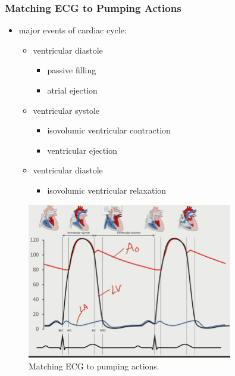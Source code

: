 \documentclass[10pt]{article}
\begin{document}
\subsubsection{Matching ECG to Pumping Actions}
\begin{itemize}
    \item major events of cardiac cycle:
        \begin{itemize}
            \item ventricular diastole
                \begin{itemize}
                    \item passive filling
                    \item atrial ejection
                \end{itemize}
            \item ventricular systole
                \begin{itemize}
                    \item isovolumic ventricular contraction
                    \item ventricular ejection
                \end{itemize}
            \item ventricular diastole 
                \begin{itemize}
                    \item isovolumic ventricular relaxation
                \end{itemize}
        \end{itemize}
\end{itemize}
\begin{figure}[H]
    \centering
    \includegraphics[width=0.8\textwidth]{ECGToPump}
    \caption{Matching ECG to pumping actions.}
    \label{fig:ECGToPump}
\end{figure}
\end{document}
